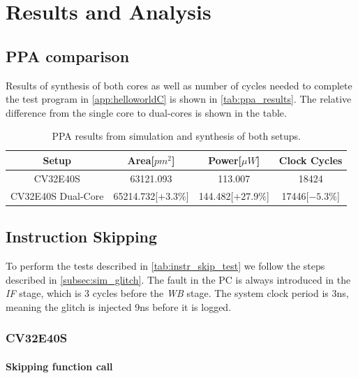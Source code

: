 \chapter{Results and Analysis}
\label{chap5}

\section{PPA comparison}
\label{sec:synth_comparison}

Results of synthesis of both cores as well as number of cycles needed to complete the test program in \autoref{app:helloworldC} is shown in \autoref{tab:ppa_results}. The relative difference from the single core to dual-cores is shown in the table.

\begin{table}[h]
\centering
\caption{PPA results from simulation and synthesis of both setups.}
\label{tab:ppa_results}
\begin{tabular}{c|ccc}
\toprule 
Setup & Area[$pm^2$] & Power[$\mu W$] & Clock Cycles\\
\midrule
\rowcolor{black!20} CV32E40S & 63121.093 & 113.007 & 18424\\
CV32E40S Dual-Core & 65214.732[$+3.3\%$] & 144.482[$+27.9\%$] & 17446[$-5.3\%$] \\
\bottomrule
\end{tabular}
\end{table}

\section{Instruction Skipping}
\label{sec:instr_skip_result}

To perform the tests described in \autoref{tab:instr_skip_test} we follow the steps described in \autoref{subsec:sim_glitch}. The fault in the PC is always introduced in the \textit{IF} stage, which is 3 cycles before the \textit{WB} stage. The system clock period is 3ns, meaning the glitch is injected 9ns before it is logged. 

\subsection{CV32E40S}
\label{subsec:single_instr_skip}

\subsubsection{Skipping function call}

